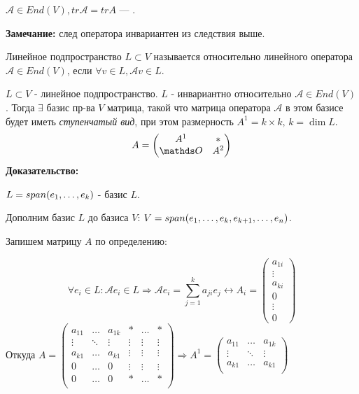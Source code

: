  $\mathcal{A} \in End(V), tr \mathcal{A} = tr A$ --- .

\textbf{Замечание:} след оператора инвариантен из следствия выше.

 Линейное подпространство $L \subset V$ называется  относительно линейного оператора $\mathcal{A}\in End(V)$, если $\forall v \in L, \mathcal{A} v \in L$.


$L \subset V$ - линейное подпространство. $L$ - инвариантно относительно $\mathcal{A} \in End(V)$. Тогда $ \exists $ базис пр-ва $V$ матрица, такой что матрица оператора $\mathcal{A}$ в этом базисе будет иметь \emph{ступенчатый вид}, при этом размерность $A^1 = k \times k,  \, k = \dim L$.
$$A =\begin{pmatrix}
    A^1 & *\\
    \zero & A^2
\end{pmatrix}$$
\textbf{Доказательство:}

$L = span (e_1,\ldots, e_k)$ - базис $L$.

Дополним базис $L$ до базиса $V$: $V = span (e_1,\ldots, e_k, e_{k+1},\ldots,e_n)$.

Запишем матрицу $A$ по определению:

$$\forall e_i\in L:\mathcal{A}e_i \in L  \Rightarrow \mathcal{A}e_i = \sum\limits_{j=1}^ka_{ji}e_j \leftrightarrow A_i = \begin{pmatrix}
    a_{1i}\\
    \vdots\\
    a_{ki}\\
    0\\
    \vdots\\0
\end{pmatrix}$$ 
Откуда $A = \begin{pmatrix}
    a_{11}&\ldots&a_{1k} & * & \ldots & *\\
    \vdots&\ddots & \vdots &\vdots& \vdots & \vdots\\
      a_{k1}&\ldots &  a_{k1} &\vdots& \vdots & \vdots\\
      0&\ldots &  0 &\vdots& \vdots & \vdots\\
        0&\ldots &  0 &*& \ldots & *\\
\end{pmatrix} \Rightarrow A^1 = \begin{pmatrix}
     a_{11}&\ldots&a_{1k}\\
     \vdots&\ddots & \vdots\\
     a_{k1}&\ldots &  a_{k1} \\
\end{pmatrix}$

